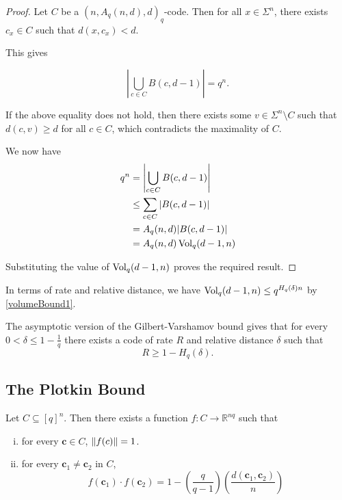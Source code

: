 \begin{proof}
    Let $C$ be a $(n,A_q(n,d),d)_q$-code. Then for all $x\in\Sigma^n$, there exists $c_x\in C$ such that $d(x,c_x)< d$.
    
    This gives
    
    $$\left| \bigcup_{c\in C}B(c,d-1)\right| =q^n.$$
    
    If the above equality does not hold, then there exists some $v\in \Sigma^n\setminus C$ such that $d(c,v)\geq d$ for all $c\in C$, which contradicts the maximality of $C$.
    
    We now have
    \begin{align*}
        q^n &= \left| \bigcup_{c\in C}B(c,d-1)\right|  \\
            &\leq \sum_{c\in C}\left| B(c,d-1)\right|  \\
            &= A_q(n,d) |B(c,d-1)|  \\
            &= A_q(n,d)\operatorname{Vol}_q(d-1,n)
    \end{align*}
    
    Substituting the value of $\operatorname{Vol}_q(d-1,n)$ proves the required result.
\end{proof}

In terms of rate and relative distance, we have $\operatorname{Vol}_q(d-1,n)\leq q^{H_q(\delta)n}$ by \ref{volumeBound1}.

\vspace{2mm}
The asymptotic version of the Gilbert-Varshamov bound gives that for every $0<\delta\leq 1-\frac{1}{q}$ there exists a code of rate $R$ and relative distance $\delta$ such that $$R\geq 1-H_q(\delta).$$


\subsection{The Plotkin Bound}

\begin{lemma}
\label{mappingLemma}
    Let $C\subseteq[q]^n$. Then there exists a function $f:C\to \mathbb{R}^{nq}$ such that
    \begin{enumerate}[(i)]
        \item for every $\textbf{c}\in C$, $\left\lVert f(c)\right\rVert=1$.
        \item for every $\textbf{c}_1\neq \textbf{c}_2$ in $C$,
        $$f(\textbf{c}_1)\cdot f(\textbf{c}_2)=1-\left(\frac{q}{q-1}\right)\left(\frac{d(\textbf{c}_1,\textbf{c}_2)}{n}\right)$$
    \end{enumerate}
\end{lemma}

